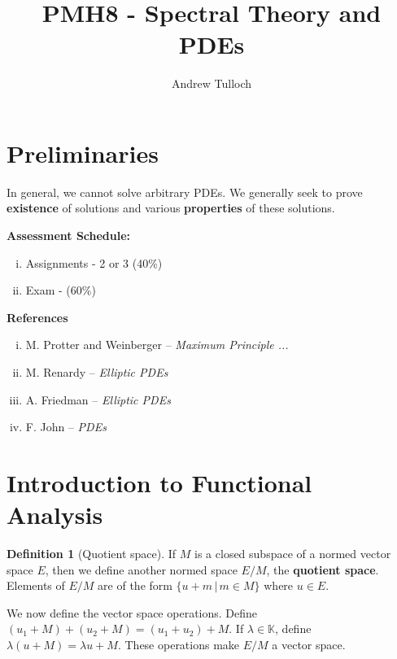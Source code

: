 \documentclass[10pt, oneside, reqno]{amsart}
\title{PMH8 - Spectral Theory and PDEs}								%
\author{Andrew Tulloch}
\theoremstyle{plain}%
\numberwithin{equation}{section}
\theoremstyle{definition}
\newtheorem{defn}[thm]{Definition}
\theoremstyle{remark}
\newcommand{\given}{ \, | \,}
\newcommand{\K}{\mathbb{K}}
\begin{document}
\maketitle \tableofcontents \clearpage


\section{Preliminaries} %
\label{sec:preliminaries}


In general, we cannot solve arbitrary PDEs.  We generally seek to prove \textbf{existence} of solutions and various \textbf{properties} of these solutions.  


\textbf{Assessment Schedule:}
\begin{enumerate}[(i)]
	\item Assignments - 2 or 3 (40\%)
	\item Exam - (60\%) 
\end{enumerate}

\textbf{References}
\begin{enumerate}[(i)]
	\item M. Protter and Weinberger -- \emph{Maximum Principle ...}
	\item M. Renardy -- \emph{Elliptic PDEs}
	\item A. Friedman -- \emph{Elliptic PDEs}
	\item F. John -- \emph{PDEs}
\end{enumerate}

\section{Introduction to Functional Analysis} %
\label{sec:introduction_to_functional_analysis_}

\begin{defn}[Quotient space]
	If $M$ is a closed subspace of a normed vector space $E$, then we define another normed space $E / M$, the \textbf{quotient space}.  Elements of $E / M$ are of the form  $\{ u + m \given m \in M \}$ where $u \in E$. 

	We now define the vector space operations.  Define $(u_1 + M) + (u_2 + M) = (u_1 + u_2) + M$.  If $\lambda \in \K$, define $\lambda(u + M) = \lambda u + M$.  These operations make $E/M$ a vector space.
\end{defn}
\end{document}
